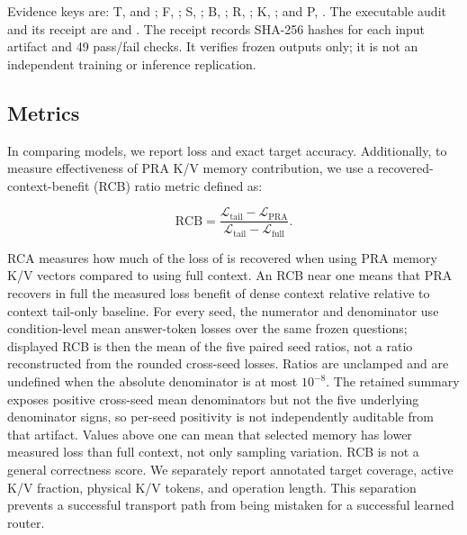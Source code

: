\documentclass[11pt]{article}
\begin{document}
Evidence keys are: T,  and
; F,
; S,
; B,
; R,
; K,
; and P,
.
The executable audit and its receipt are
 and
.
The receipt records SHA-256 hashes for
each input artifact and 49 pass/fail checks. It verifies frozen outputs only;
it is not an independent training or inference replication.

\subsection{Metrics}
\label{sec:eval-metrics}

In comparing models, we report loss and exact target accuracy. 
Additionally, to measure effectiveness of PRA K/V memory contribution, 
we use a recovered-context-benefit (RCB) ratio metric defined as:

\begin{equation}
 \mathrm{RCB}=\frac{\mathcal{L}_{\mathrm{tail}}-\mathcal{L}_{\mathrm{PRA}}}
 {\mathcal{L}_{\mathrm{tail}}-\mathcal{L}_{\mathrm{full}}}.
 \label{eq:rcb}
\end{equation}

RCA measures how much of the loss of is recovered when using PRA memory K/V vectors
compared to using full context. 
An RCB near one means that PRA recovers in full the measured loss benefit of dense
context relative relative to context tail-only baseline. For every seed,
the numerator and denominator use condition-level mean answer-token losses over the same
frozen questions; displayed RCB is then the mean of the five paired seed ratios,
not a ratio reconstructed from the rounded cross-seed losses.
Ratios are unclamped and are undefined when the absolute denominator is at most
$10^{-8}$. The retained summary exposes positive cross-seed mean denominators but not
the five underlying denominator signs, so per-seed positivity is not independently
auditable from that artifact. Values above one can mean that selected memory has lower
measured loss than full context, not only sampling variation.
RCB is not a general correctness score. We separately report annotated target coverage,
active K/V fraction, physical K/V tokens, and operation length.
This separation prevents a successful transport path from being mistaken for a
successful learned router.
\end{document}
